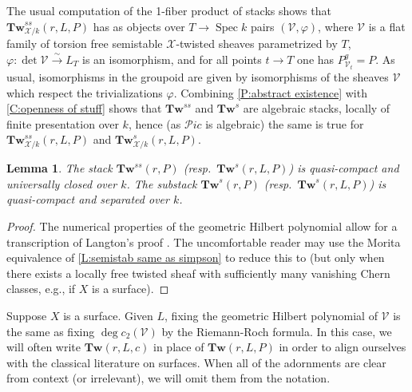 \documentclass[11pt]{amsart}
\newcommand{\ms}[1]{\mathscr #1}
\newcommand{\simto}{\stackrel{\sim}{\to}}
\renewcommand{\phi}{\varphi}
\newcommand{\spec}{\operatorname{Spec}}
\renewcommand{\[}{[\!\hspace{0.03em}[}
\renewcommand{\]}{]\!\hspace{0.03em}]}
\renewcommand{\(}{(\!\hspace{0.03em}(}
\renewcommand{\)}{)\!\hspace{0.03em})}
\newcommand{\Tw}{\mathbf{Tw}}
\newtheorem{lem}{Lemma}[subsubsection]%
\theoremstyle{definition}
\theoremstyle{remark}
\begin{document}
The usual computation \cite[2.2.2]{l-mb} of the 1-fiber product of stacks shows 
that $\Tw^{ss}_{\ms X/k}(r,L,P)$ has as objects over $T\to\spec k$ 
pairs $(\ms V,\phi)$, where $\ms V$ is a flat family of torsion free 
semistable $\ms X$-twisted sheaves parametrized by $T$, 
$\phi:\det\ms V\simto L_{T}$ is an isomorphism, and for all points 
$t\to T$ one has $P^{g}_{\ms V_{t}}=P$.  
As usual, isomorphisms in the groupoid are given by 
isomorphisms of the sheaves $\ms V$ which respect the 
trivializations $\phi$.  Combining \ref{P:abstract existence} with 
\ref{C:openness of stuff} shows that $\Tw^{ss}$ and $\Tw^{s}$ are 
algebraic stacks, locally of finite presentation over $k$, hence (as 
$\ms Pic$ is algebraic) the 
same is true for $\Tw^{ss}_{\ms X/k}(r,L,P)$ and $\Tw^{s}_{\ms 
X/k}(r,L,P)$.

\begin{lem} The stack $\Tw^{ss}(r,P)$ (resp.\ $\Tw^{s}(r,L,P)$) is quasi-compact and universally 
closed over $k$.  The substack $\Tw^{s}(r,P)$ (resp.\ 
$\Tw^{s}(r,L,P)$) is quasi-compact and separated over $k$.
\end{lem}
\begin{proof} The numerical properties of the geometric Hilbert 
polynomial allow for a transcription of Langton's proof 
\cite[\S2.B]{h-l}.  The uncomfortable reader may use the Morita equivalence of 
\ref{L:semistab same as simpson} to reduce this to \cite[\S4]{simpson} (but 
only when 
there exists a locally free twisted sheaf with sufficiently many vanishing Chern 
classes, e.g., if $X$ is a surface).
\end{proof}


Suppose $X$ is a surface.  Given $L$, fixing the geometric Hilbert 
polynomial of $\ms V$ is the same as fixing $\deg c_{2}(\ms V)$ by 
the Riemann-Roch formula.  In 
this case, we will often write $\Tw(r,L,c)$ in place of $\Tw(r,L,P)$ 
in order to align ourselves with the classical literature on surfaces.  
When all of the adornments are clear from context (or irrelevant), we will omit them from 
the notation.
\end{document}
